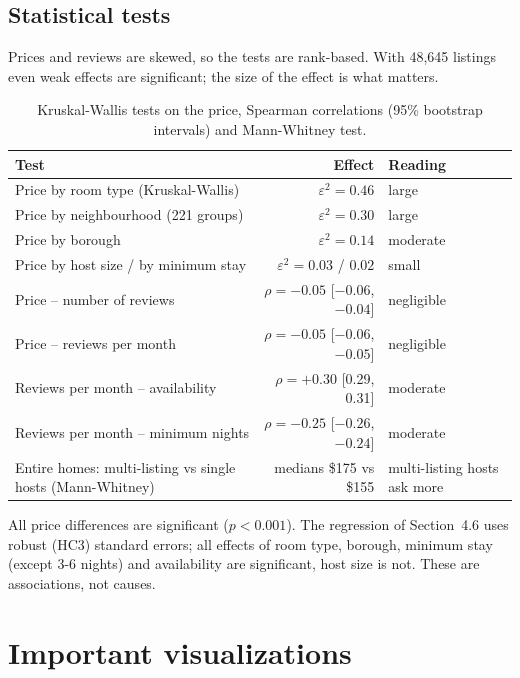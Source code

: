 \documentclass[12pt,a4paper]{article}
\begin{document}
\subsection{Statistical tests}

Prices and reviews are skewed, so the tests are rank-based. With 48{,}645 listings even weak effects
are significant; the size of the effect is what matters.

\begin{table}[H]\centering\small
\caption{Kruskal-Wallis tests on the price, Spearman correlations (95\% bootstrap intervals) and Mann-Whitney test.}
\begin{tabularx}{\linewidth}{@{}Xrl@{}}
\toprule
Test & Effect & Reading\\\midrule
Price by room type (Kruskal-Wallis) & $\varepsilon^2 = 0.46$ & large\\
Price by neighbourhood (221 groups) & $\varepsilon^2 = 0.30$ & large\\
Price by borough & $\varepsilon^2 = 0.14$ & moderate\\
Price by host size / by minimum stay & $\varepsilon^2 = 0.03$ / $0.02$ & small\\
Price -- number of reviews & $\rho = -0.05$ [$-0.06$, $-0.04$] & negligible\\
Price -- reviews per month & $\rho = -0.05$ [$-0.06$, $-0.05$] & negligible\\
Reviews per month -- availability & $\rho = +0.30$ [0.29, 0.31] & moderate\\
Reviews per month -- minimum nights & $\rho = -0.25$ [$-0.26$, $-0.24$] & moderate\\
Entire homes: multi-listing vs single hosts (Mann-Whitney) & medians \$175 vs \$155 & multi-listing hosts ask more\\
\bottomrule
\end{tabularx}
\end{table}

All price differences are significant ($p < 0.001$). The regression of Section~4.6 uses robust (HC3)
standard errors; all effects of room type, borough, minimum stay (except 3-6 nights) and availability
are significant, host size is not. These are associations, not causes.

\section{Important visualizations}
\end{document}
